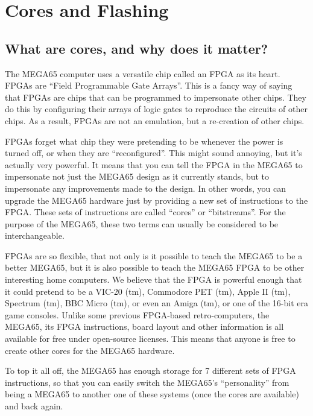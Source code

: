 \chapter{Cores and Flashing}
\label{cha:cores}

\section{What are cores, and why does it matter?}

The MEGA65 computer uses a versatile chip called an FPGA as its heart.
FPGAs are ``Field Programmable Gate Arrays''. This is a fancy way of
saying that FPGAs are chips that can be programmed to impersonate
other chips.  They do this by configuring their arrays of logic gates to
reproduce the circuits of other chips. As a result, FPGAs are not an emulation,
but a re-creation of other chips.

FPGAs forget what chip they were pretending
to be whenever the power is turned off, or when they are ``reconfigured''.
This might sound annoying, but it's actually very powerful. It means that
you can tell the FPGA in the MEGA65 to impersonate not just the MEGA65 design
as it currently stands, but to impersonate any improvements made to the design.
In other words, you can upgrade the MEGA65 hardware just by providing a new
set of instructions to the FPGA.  These sets of instructions are called ``cores''
or ``bitstreams''.  For the purpose of the MEGA65, these two terms can usually be
considered to be interchangeable.

FPGAs are so flexible, that not only is it possible to teach the MEGA65 to be a better
MEGA65, but it is also possible to teach the MEGA65 FPGA to be other interesting
home computers.  We believe that the FPGA is powerful enough that it could pretend to be
a VIC-20 (tm), Commodore PET (tm), Apple II (tm), Spectrum (tm), BBC Micro (tm), or even
an Amiga (tm), or one of the 16-bit era game consoles.  Unlike some previous FPGA-based
retro-computers, the MEGA65, its FPGA instructions, board layout and other information is
all available for free under open-source licenses. This means that anyone is free to
create other cores for the MEGA65 hardware.

To top it all off, the MEGA65 has enough storage for 7 different sets of FPGA instructions,
so that you can easily switch the MEGA65's ``personality'' from being a MEGA65 to another one
of these systems (once the cores are available) and back again.

